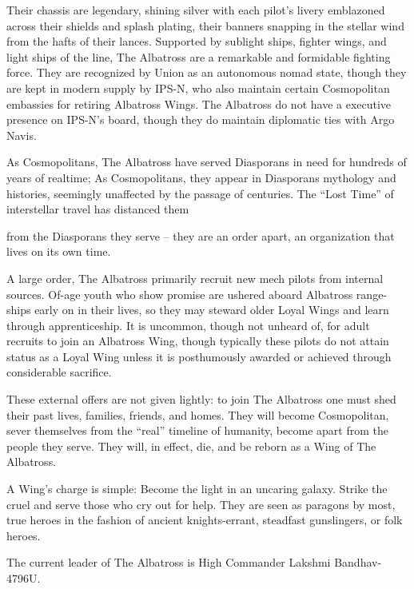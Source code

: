                                                   Their chassis are legendary, shining silver with each  
pilot’s livery emblazoned across their shields and splash plating, their banners snapping in the  
stellar wind from the hafts of their lances. Supported by sublight ships, fighter wings, and light  
ships of the line, The Albatross are a remarkable and formidable fighting force. They are  
recognized by Union as an autonomous nomad state, though they are kept in modern supply by  
IPS-N, who also maintain certain Cosmopolitan embassies for retiring Albatross Wings. The  
Albatross do not have a executive presence on IPS-N’s board, though they do maintain  
diplomatic ties with Argo Navis.  
 

As Cosmopolitans, The Albatross have served Diasporans in need for hundreds of years of  
realtime; As Cosmopolitans, they appear in Diasporans mythology and histories, seemingly  
unaffected by the passage of centuries. The “Lost Time” of interstellar travel has distanced them  

                                                                                                          


from the Diasporans they serve -- they are an order apart, an organization that lives on its own  
time.
 

A large order, The Albatross primarily recruit new mech pilots from internal sources. Of-age youth  
who show promise are ushered aboard Albatross range-ships early on in their lives, so they may  
steward older Loyal Wings and learn through apprenticeship. It is uncommon, though not  
unheard of, for adult recruits to join an Albatross Wing, though typically these pilots do not attain  
status as a Loyal Wing unless it is posthumously awarded or achieved through considerable  
sacrifice. 
 

These external offers are not given lightly: to join The Albatross one must shed their past lives,  
families, friends, and homes. They will become Cosmopolitan, sever themselves from the “real”  
timeline of humanity, become apart from the people they serve. They will, in effect, die, and be  
reborn as a Wing of The Albatross. 
 

A Wing’s charge is simple: Become the light in an uncaring galaxy. Strike the cruel and serve  
those who cry out for help. They are seen as paragons by most, true heroes in the fashion of  
ancient knights-errant, steadfast gunslingers, or folk heroes.   
 

The current leader of The Albatross is High Commander Lakshmi Bandhav-4796U. 
 

